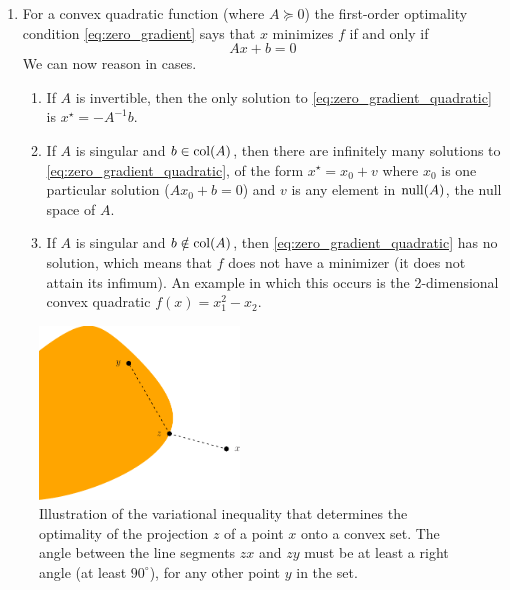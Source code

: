 \begin{Example}
\begin{enumerate}[label=\alph*., ref=\alph*]
\item {}
  For a convex quadratic function  (where $A \succeq 0$) the first-order optimality condition
  \eqref{eq:zero_gradient} says that $x$ minimizes $f$ if and only if
  \begin{equation} 
  \label{eq:zero_gradient_quadratic}
  Ax + b =  0
  \end{equation}
  We can now reason in cases. 
 \begin{enumerate}[label=(\roman*)]
 \item If $A$ is invertible, then the only solution to
   \eqref{eq:zero_gradient_quadratic} is $x^\star = -A^{-1} b$. 

\item If $A$ is singular and $b \in \operatorname{col}(A)$, then there are infinitely many
  solutions to \eqref{eq:zero_gradient_quadratic}, of the form $x^\star = x_0 +
  v$ where $x_0$ is one particular solution ($Ax_0 + b = 0$) and $v$ is any
  element in $\operatorname{null}(A)$, the null space of $A$. 

 \item If $A$ is singular and $b \notin \operatorname{col}(A)$, then
   \eqref{eq:zero_gradient_quadratic} has no solution, which means that $f$ does
   not have a minimizer (it does not attain its infimum). An example in which
   this occurs is the 2-dimensional convex quadratic $f(x) = x_1^2 - x_2$. 
 \end{enumerate}
\end{enumerate}
\end{Example}

\begin{figure}[tb]
\centering
\includegraphics[width=0.475\textwidth]{fig/variational_inequality.pdf}
\caption{Illustration of the variational inequality that determines the
  optimality of the projection $z$ of a point $x$ onto a convex set. The angle
  between the line segments $zx$ and $zy$ must be at least a right angle (at
  least $90^\circ$), for any other point $y$ in the set.} 
\label{fig:variational_inequality}
\end{figure}

